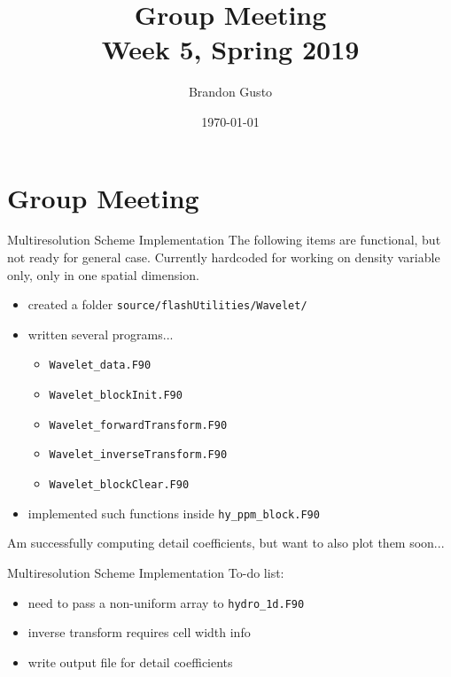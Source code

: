 \documentclass{beamer}
\begin{document}
\section{Group Meeting}
\title{Group Meeting \\ Week 5, Spring 2019}
\author{Brandon Gusto} %
\date{\today}
\frame{\titlepage}

\begin{frame}[fragile]{Multiresolution Scheme Implementation}
  The following items are functional, but not ready for general case. Currently hardcoded
  for working on density variable only, only in one spatial dimension. 
  \begin{itemize}
    \setlength\itemsep{1em}
    \item created a folder \texttt{source/flashUtilities/Wavelet/}
    \item written several programs... 
      \begin{itemize}
        \item \texttt{Wavelet\_data.F90}
        \item \texttt{Wavelet\_blockInit.F90}
        \item \texttt{Wavelet\_forwardTransform.F90}
        \item \texttt{Wavelet\_inverseTransform.F90}
        \item \texttt{Wavelet\_blockClear.F90}
      \end{itemize} 
    \item implemented such functions inside \texttt{hy\_ppm\_block.F90}
  \end{itemize}
  Am successfully computing detail coefficients, but want to also plot them soon...
\end{frame}

\begin{frame}[fragile]{Multiresolution Scheme Implementation}
  To-do list:
  \begin{itemize}
    \item need to pass a non-uniform array to \texttt{hydro\_1d.F90}
    \item inverse transform requires cell width info
    \item write output file for detail coefficients
  \end{itemize}
\end{frame}
\end{document}

